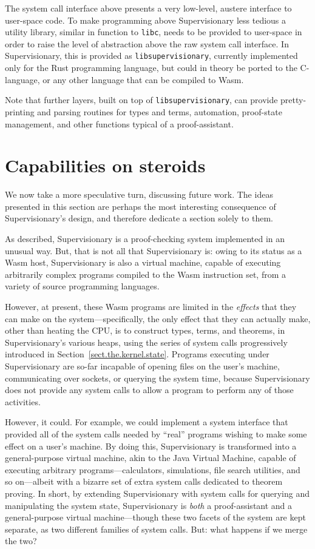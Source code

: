 \documentclass[a4paper, UKenglish, cleveref, autoref, thm-restate, colorlinks]{lipics-v2021}
\begin{document}
The system call interface above presents a very low-level, austere interface to user-space code.
To make programming above Supervisionary less tedious a utility library, similar in function to \texttt{libc}, needs to be provided to user-space in order to raise the level of abstraction above the raw system call interface.
In Supervisionary, this is provided as \texttt{libsupervisionary}, currently implemented only for the Rust programming language, but could in theory be ported to the C-language, or any other language that can be compiled to Wasm.

Note that further layers, built on top of \texttt{libsupervisionary}, can provide pretty-printing and parsing routines for types and terms, automation, proof-state management, and other functions typical of a proof-assistant.

\section{Capabilities on steroids}
\label{sect.capabilities.on.steroids}

We now take a more speculative turn, discussing future work.
The ideas presented in this section are perhaps the most interesting consequence of Supervisionary's design, and therefore dedicate a section solely to them.

As described, Supervisionary is a proof-checking system implemented in an unusual way.
But, that is not all that Supervisionary is: owing to its status as a Wasm host, Supervisionary is also a virtual machine, capable of executing arbitrarily complex programs compiled to the Wasm instruction set, from a variety of source programming languages.

However, at present, these Wasm programs are limited in the \emph{effects} that they can make on the system---specifically, the only effect that they can actually make, other than heating the CPU, is to construct types, terms, and theorems, in Supervisionary's various heaps, using the series of system calls progressively introduced in Section~\ref{sect.the.kernel.state}.
Programs executing under Supervisionary are so-far incapable of opening files on the user's machine, communicating over sockets, or querying the system time, because Supervisionary does not provide any system calls to allow a program to perform any of those activities.

However, it could.
For example, we could implement a system interface that provided all of the system calls needed by ``real'' programs wishing to make some effect on a user's machine.
By doing this, Supervisionary is transformed into a general-purpose virtual machine, akin to the Java Virtual Machine, capable of executing arbitrary programs---calculators, simulations, file search utilities, and so on---albeit with a bizarre set of extra system calls dedicated to theorem proving.
In short, by extending Supervisionary with system calls for querying and manipulating the system state, Supervisionary is \emph{both} a proof-assistant and a general-purpose virtual machine---though these two facets of the system are kept separate, as two different families of system calls.
But: what happens if we merge the two?
\end{document}

